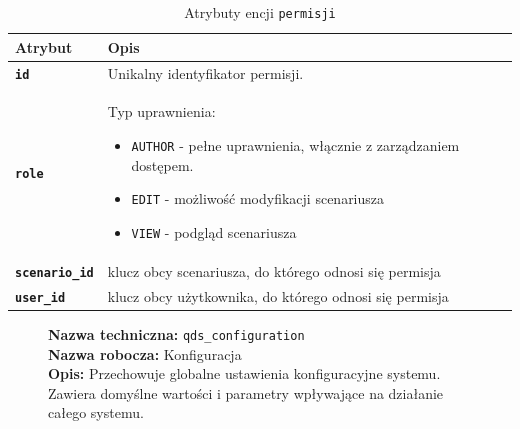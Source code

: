 \begin{table}[H]
    \centering
    \renewcommand{\arraystretch}{1.6}
    \begin{tabular}{|>{\bfseries}l|p{}|}
        \hline
        \rowcolor[HTML]{EFEFEF} \textbf{Atrybut} & \textbf{Opis} \\
        \hline
        \texttt{id} & Unikalny identyfikator permisji. \\
        \hline
        \texttt{role} & Typ uprawnienia:
        \begin{itemize}
            \item \texttt{AUTHOR} - pełne uprawnienia, włącznie z zarządzaniem dostępem.
            \item \texttt{EDIT} - możliwość modyfikacji scenariusza
            \item \texttt{VIEW} - podgląd scenariusza
        \end{itemize} \\
        \hline
        \texttt{scenario\_id} & klucz obcy scenariusza, do którego odnosi się permisja \\
        \hline
        \texttt{user\_id} & klucz obcy użytkownika, do którego odnosi się permisja \\
        \hline
    \end{tabular}
    \caption{Atrybuty encji \texttt{permisji}}
\end{table}

\begin{figure}[H]
    \centering
    \begin{minipage}{0.8\textwidth}
        \begin{framed}
            \noindent\textbf{\large Nazwa techniczna:} \texttt{qds\_configuration} \\
            \textbf{\large Nazwa robocza:} Konfiguracja \\
            \textbf{\large Opis:} Przechowuje globalne ustawienia konfiguracyjne systemu. Zawiera domyślne wartości
            i parametry wpływające na działanie całego systemu.
        \end{framed}
    \end{minipage}
\end{figure}

